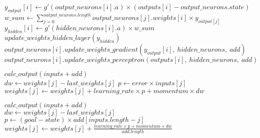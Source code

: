 \documentclass[a4paper]{article}
\begin{document}
\begin{algorithmic}

\State $y_{output}[i] \gets g'(output\_neurons[i].a) \times ( outputs[i] - output\_neurons.state )$
\EndFor
\\
\State $w\_sum \gets \sum \limits_{j=0}^{output\_neurons.length} output\_neurons[j].weights[i] \times y_{output[j]}$
\State $y_{hidden}[i] \gets g'(hidden\_neurons[i].a) \times w\_sum$
\EndFor
\State $update\_weights\_hidden\_layer(y_{hidden})$
\\
\State $output\_neurons[i].update\_weights\_gradient(y_{output}[i],\ hidden\_neurons,\ add)$
\State $output\_neurons[i].update\_weights\_perceptron(outputs[i],\ hidden\_neurons,\ add)$
\EndFor
\EndFunction

\end{algorithmic}


\begin{algorithmic}

\State $calc\_output(inputs + add)$
\\
\State $dw \gets weights[j] - last\_weights[j]$
\State $p \gets error \times inputs[j]$
\State $weights[j] \gets weights[j] + learning\_rate \times p + momentum \times dw$
\EndFor
\EndFunction

\end{algorithmic}


\begin{algorithmic}

\State $calc\_output(inputs + add)$
\\
\State $dw \gets weights[j] - last\_weights[j]$
\State $p \gets (goal - state ) \times add[inputs.length - j]$
\State $weights[j] \gets weights[j] + \frac{learning\_rate \times p + momentum \times dw}{add.length} $
\EndFor
\EndFunction

\end{algorithmic}
\end{document}
